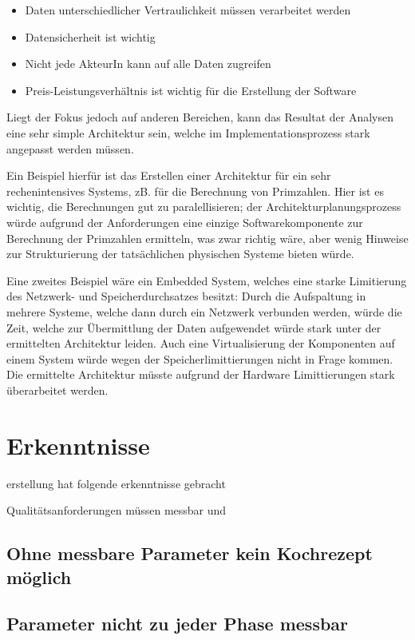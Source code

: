 \begin{itemize}
  \item Daten unterschiedlicher Vertraulichkeit müssen verarbeitet werden
  \item Datensicherheit ist wichtig
  \item Nicht jede AkteurIn kann auf alle Daten zugreifen
  \item Preis-Leistungsverhältnis ist wichtig für die Erstellung der Software
\end{itemize}

Liegt der Fokus jedoch auf anderen Bereichen, kann das Resultat der Analysen eine sehr simple Architektur sein, welche im Implementationsprozess stark angepasst werden müssen.

Ein Beispiel hierfür ist das Erstellen einer Architektur für ein sehr rechenintensives Systems, zB. für die Berechnung von Primzahlen. Hier ist es wichtig, die Berechnungen gut zu paralellisieren; der Architekturplanungsprozess würde aufgrund der Anforderungen eine einzige Softwarekomponente zur Berechnung der Primzahlen ermitteln, was zwar richtig wäre, aber wenig Hinweise zur Strukturierung der tatsächlichen physischen Systeme bieten würde.

Eine zweites Beispiel wäre ein Embedded System, welches eine starke Limitierung des Netzwerk- und Speicherdurchsatzes besitzt: Durch die Aufspaltung in mehrere Systeme, welche dann durch ein Netzwerk verbunden werden, würde die Zeit, welche zur Übermittlung der Daten aufgewendet würde stark unter der ermittelten Architektur leiden. Auch eine Virtualisierung der Komponenten auf einem System würde wegen der Speicherlimittierungen nicht in Frage kommen. Die ermittelte Architektur müsste aufgrund der Hardware Limittierungen stark überarbeitet werden.

\section{Erkenntnisse}
erstellung hat folgende erkenntnisse gebracht

Qualitätsanforderungen müssen messbar und

\subsection{Ohne messbare Parameter kein Kochrezept möglich}
\subsection{Parameter nicht zu jeder Phase messbar}
